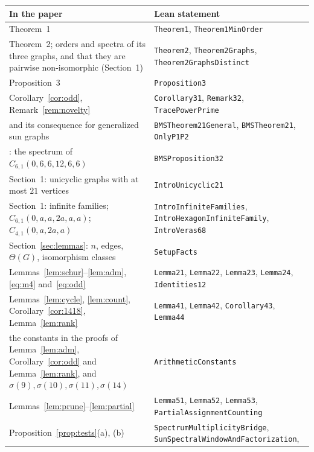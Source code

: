 \documentclass[11pt]{article}
\theoremstyle{definition}
\theoremstyle{remark}
\begin{document}
\begin{table}[ht]\centering\small
\begin{tabular}{@{}>{\raggedright\arraybackslash}p{}
 >{\raggedright\arraybackslash}p{}@{}}\toprule
In the paper & Lean statement\\\midrule
Theorem~1 & \texttt{Theorem1}, \texttt{Theorem1MinOrder}\\
Theorem~2; orders and spectra of its three graphs, and that they are pairwise
 non-isomorphic (Section~1) & \texttt{Theorem2}, \texttt{Theorem2Graphs},
 \texttt{Theorem2GraphsDistinct}\\
Proposition~3 & \texttt{Proposition3}\\
Corollary~\ref{cor:odd}, Remark~\ref{rem:novelty} & \texttt{Corollary31},
 \texttt{Remark32}, \texttt{TracePowerPrime}\\
\cite[Theorem~2.1]{bms} and its consequence for generalized sun graphs &
 \texttt{BMSTheorem21General}, \texttt{BMSTheorem21}, \texttt{OnlyP1P2}\\
\cite[Proposition~3.2]{bms}: the spectrum of $C_{6,1}(0,6,6,12,6,6)$ &
 \texttt{BMSProposition32}\\
Section~1: unicyclic graphs with at most $21$ vertices &
 \texttt{IntroUnicyclic21}\\
Section~1: infinite families; $C_{6,1}(0,a,a,2a,a,a)$;
 $C_{4,1}(0,a,2a,a)$ & \texttt{IntroInfiniteFamilies},
 \texttt{IntroHexagonInfiniteFamily}, \texttt{IntroVeras68}\\
Section~\ref{sec:lemmas}: $n$, edges, $\Theta(G)$, isomorphism classes &
 \texttt{SetupFacts}\\
Lemmas~\ref{lem:schur}--\ref{lem:adm}, \eqref{eq:m4} and~\eqref{eq:odd} &
 \texttt{Lemma21}, \texttt{Lemma22}, \texttt{Lemma23}, \texttt{Lemma24},
 \texttt{Identities12}\\
Lemmas~\ref{lem:cycle}, \ref{lem:count}, Corollary~\ref{cor:1418},
 Lemma~\ref{lem:rank} & \texttt{Lemma41}, \texttt{Lemma42},
 \texttt{Corollary43}, \texttt{Lemma44}\\
the constants in the proofs of Lemma~\ref{lem:adm}, Corollary~\ref{cor:odd}
 and Lemma~\ref{lem:rank}, and $\sigma(9),\sigma(10),\sigma(11),\sigma(14)$ &
 \texttt{ArithmeticConstants}\\
Lemmas~\ref{lem:prune}--\ref{lem:partial} & \texttt{Lemma51},
 \texttt{Lemma52}, \texttt{Lemma53}, \texttt{PartialAssignmentCounting}\\
Proposition~\ref{prop:tests}(a), (b) & \texttt{SpectrumMultiplicityBridge},
 \texttt{SunSpectralWindowAndFactorization},

\end{tabular}
\end{table}
\end{document}
